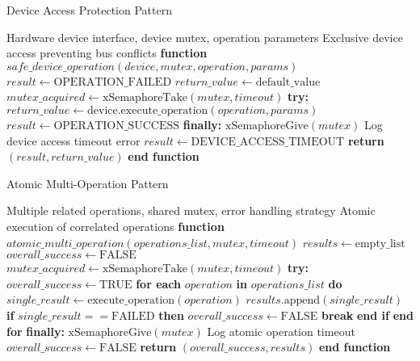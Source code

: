 \documentclass{article}
\begin{document}
\begin{algorithm}
\caption{Device Access Protection Pattern}
\label{alg:device_access_pattern}
\begin{algorithmic}[1]
\REQUIRE Hardware device interface, device mutex, operation parameters
\ENSURE Exclusive device access preventing bus conflicts
\STATE \textbf{function} $safe\_device\_operation(device, mutex, operation, params)$
\STATE $result \leftarrow \text{OPERATION\_FAILED}$
\STATE $return\_value \leftarrow \text{default\_value}$
\STATE 
\STATE $mutex\_acquired \leftarrow \text{xSemaphoreTake}(mutex, timeout)$
    \STATE \textbf{try:}
    \STATE \quad $return\_value \leftarrow \text{device.execute\_operation}(operation, params)$
    \STATE \quad $result \leftarrow \text{OPERATION\_SUCCESS}$
    \STATE \textbf{finally:}
    \STATE \quad $\text{xSemaphoreGive}(mutex)$ 
\ELSE
    \STATE Log device access timeout error
    \STATE $result \leftarrow \text{DEVICE\_ACCESS\_TIMEOUT}$
\ENDIF
\STATE 
\STATE \textbf{return} $(result, return\_value)$
\STATE \textbf{end function}
\end{algorithmic}
\end{algorithm}

\begin{algorithm}
\caption{Atomic Multi-Operation Pattern}
\label{alg:atomic_multi_operation}
\begin{algorithmic}[1]
\REQUIRE Multiple related operations, shared mutex, error handling strategy
\ENSURE Atomic execution of correlated operations
\STATE \textbf{function} $atomic\_multi\_operation(operations\_list, mutex, timeout)$
\STATE $results \leftarrow \text{empty\_list}$
\STATE $overall\_success \leftarrow \text{FALSE}$
\STATE 
\STATE $mutex\_acquired \leftarrow \text{xSemaphoreTake}(mutex, timeout)$
    \STATE \textbf{try:}
    \STATE \quad $overall\_success \leftarrow \text{TRUE}$
    \STATE \quad \textbf{for each} $operation$ \textbf{in} $operations\_list$ \textbf{do}
    \STATE \quad \quad $single\_result \leftarrow \text{execute\_operation}(operation)$
    \STATE \quad \quad $results.\text{append}(single\_result)$
    \STATE \quad \quad \textbf{if} $single\_result == \text{FAILED}$ \textbf{then}
    \STATE \quad \quad \quad $overall\_success \leftarrow \text{FALSE}$
    \STATE \quad \quad \quad \textbf{break} 
    \STATE \quad \quad \textbf{end if}
    \STATE \quad \textbf{end for}
    \STATE \textbf{finally:}
    \STATE \quad $\text{xSemaphoreGive}(mutex)$ 
\ELSE
    \STATE Log atomic operation timeout
    \STATE $overall\_success \leftarrow \text{FALSE}$
\ENDIF
\STATE 
\STATE \textbf{return} $(overall\_success, results)$
\STATE \textbf{end function}
\end{algorithmic}
\end{algorithm}
\end{document}
